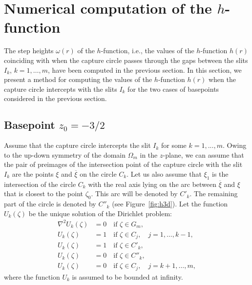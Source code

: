 \section{Numerical computation of the $h$-function}\label{sec:h-fun}


The step heights $\omega(r)$ of the $h$-function, i.e., the values of the $h$-function $h(r)$ coinciding with when the capture circle passes through the gaps between the slits $I_k$, $k=1,\ldots,m$, have been computed in the previous section. In this section, we present a method for computing the values of the $h$-function $h(r)$ when the capture circle intercepts with the slits $I_k$ for the two cases of basepoints considered in the previous section.  


\subsection{Basepoint $z_0=-3/2$}

Assume that the capture circle intercepts the slit $I_k$ for some $k=1,...,m$. 
Owing to the up-down symmetry of the domain $\Omega_m$ in the $z$-plane, we can assume that the pair of preimages of the intersection point of the capture circle with the slit $I_k$ are the points $\xi$ and $\overline{\xi}$ on the circle $C_k$.
Let us also assume that $\xi_1$ is the intersection of the circle $C_k$ with the real axis lying on the arc between $\overline{\xi}$ and $\xi$ that is closest to the point $\zeta_0$. This arc will be denoted by $C'_k$. The remaining part of the circle is denoted by $C''_k$ (see Figure~\ref{fig:h3d}). 
Let the function $U_k(\zeta)$ be the unique solution of the Dirichlet problem:
\begin{subequations}\label{eq:bdv-U3}
	\begin{align}
	\label{eq:U3-Lap}
	\nabla^2 U_k(\zeta) &= 0 \quad \mbox{if }\zeta\in G_m, \\
	\label{eq:U3-m}
	U_k(\zeta)&= 1 \quad \mbox{if }\zeta\in C_j, \quad j=1,\ldots,k-1, \\
	\label{eq:U3-k'}
	U_k(\zeta)&= 1 \quad \mbox{if }\zeta\in C'_k,  \\
	\label{eq:U3-k''}
	U_k(\zeta)&= 0 \quad \mbox{if }\zeta\in C''_k,  \\
	\label{eq:U3-p}
	U_k(\zeta)&= 0 \quad \mbox{if }\zeta\in C_j, \quad j=k+1,\ldots,m, 
	\end{align}
\end{subequations}
where the function $U_k$ is assumed to be bounded at infinity. 

